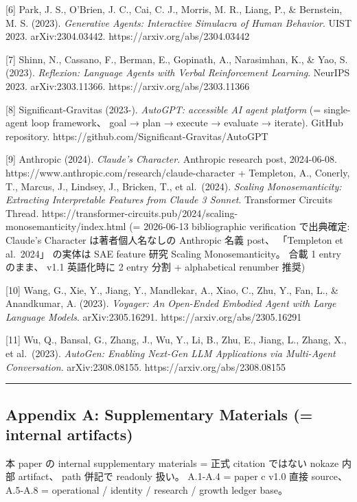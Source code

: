 \documentclass[
]{article}
\begin{document}
{[}6{]} Park, J. S., O'Brien, J. C., Cai, C. J., Morris, M. R., Liang,
P., \& Bernstein, M. S. (2023). \emph{Generative Agents: Interactive
Simulacra of Human Behavior}. UIST 2023. arXiv:2304.03442.
https://arxiv.org/abs/2304.03442

{[}7{]} Shinn, N., Cassano, F., Berman, E., Gopinath, A., Narasimhan,
K., \& Yao, S. (2023). \emph{Reflexion: Language Agents with Verbal
Reinforcement Learning}. NeurIPS 2023. arXiv:2303.11366.
https://arxiv.org/abs/2303.11366

{[}8{]} Significant-Gravitas (2023-). \emph{AutoGPT: accessible AI agent
platform} (= single-agent loop framework、 goal → plan → execute →
evaluate → iterate). GitHub repository.
https://github.com/Significant-Gravitas/AutoGPT

{[}9{]} Anthropic (2024). \emph{Claude's Character}. Anthropic research
post, 2024-06-08. https://www.anthropic.com/research/claude-character +
Templeton, A., Conerly, T., Marcus, J., Lindsey, J., Bricken, T., et
al.~(2024). \emph{Scaling Monosemanticity: Extracting Interpretable
Features from Claude 3 Sonnet}. Transformer Circuits Thread.
https://transformer-circuits.pub/2024/scaling-monosemanticity/index.html
(= 2026-06-13 bibliographic verification で出典確定: Claude's Character
は著者個人名なしの Anthropic 名義 post、 「Templeton et al.~2024」
の実体は SAE feature 研究 Scaling Monosemanticity。 合載 1 entry
のまま、 v1.1 英語化時に 2 entry 分割 + alphabetical renumber 推奨)

{[}10{]} Wang, G., Xie, Y., Jiang, Y., Mandlekar, A., Xiao, C., Zhu, Y.,
Fan, L., \& Anandkumar, A. (2023). \emph{Voyager: An Open-Ended Embodied
Agent with Large Language Models}. arXiv:2305.16291.
https://arxiv.org/abs/2305.16291

{[}11{]} Wu, Q., Bansal, G., Zhang, J., Wu, Y., Li, B., Zhu, E., Jiang,
L., Zhang, X., et al.~(2023). \emph{AutoGen: Enabling Next-Gen LLM
Applications via Multi-Agent Conversation}. arXiv:2308.08155.
https://arxiv.org/abs/2308.08155

\begin{center}\rule{0.5\linewidth}{0.5pt}\end{center}

\subsection{Appendix A: Supplementary Materials (= internal
artifacts)}\label{appendix-a-supplementary-materials-internal-artifacts}

本 paper の internal supplementary materials = 正式 citation ではない
nokaze 内部 artifact、 path 併記で readonly 扱い。 A.1-A.4 = paper c
v1.0 直接 source、 A.5-A.8 = operational / identity / research / growth
ledger base。
\end{document}
